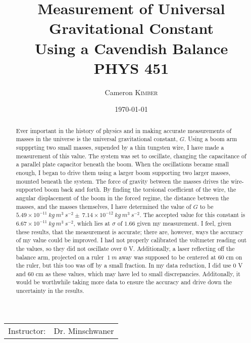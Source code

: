 \documentclass{article}
\title{Measurement of Universal Gravitational Constant \\ Using a Cavendish Balance \\ PHYS 451} %
\author{Cameron \textsc{Kimber}} %
\date{\today} %
\begin{document}
\maketitle %

\begin{center}
\begin{tabular}{l r}
Instructor: & Dr. Minschwaner %
\end{tabular}
\end{center}

\begin{abstract}

Ever important in the history of physics and in making accurate measurements of masses in the universe
is the universal gravitational constant, $G$. Using a boom arm suppprting two small masses, supended by a thin tungsten wire, I
have made a measurement of this value. The system was set to oscillate, changing the capacitance of a
parallel plate capacitor beneath the boom. When the oscillations became small enough, I began to drive them
using a larger boom supporting two larger masses, mounted beneath the system. The force of gravity between the
masses drives the wire-supported boom back and forth. By finding the torsional coefficient of the wire,
the angular displacement of the boom in the forced regime, the distance between the masses, and the masses themselves,
I have determined the value of $G$ to be $5.49 \times 10^{-11}\ kg\ m^{3}\ s^{-2} \pm\ 7.14 \times 10^{-12}\ kg\ m^{3}\ s^{-2}$.
The accepted value for this constant is $6.67 \times 10^{-11}\ kg\ m^{3}\ s^{-2}$, which lies at $\sigma$ of $1.66$ given
my measurement. I feel, given these results, that the measurement is accurate; there are, however, ways the accuracy of my
value could be improved. I had not properly calibrated the voltmeter reading out the values, so they did not oscillate over 0 V.
Additionally, a laser reflecting off the balance arm, projected on a ruler $~1\ m$ away was supposed to be centered at $60$ cm on the
ruler, but this too was off by a small fraction. In my data reduction, I did use 0 V and $60$ cm as these values, which may have led
to small discrepancies. Additonally, it would be worthwhile taking more data to ensure the accuracy and drive down the uncertainty in
the results.
\end{abstract}
\end{document}
